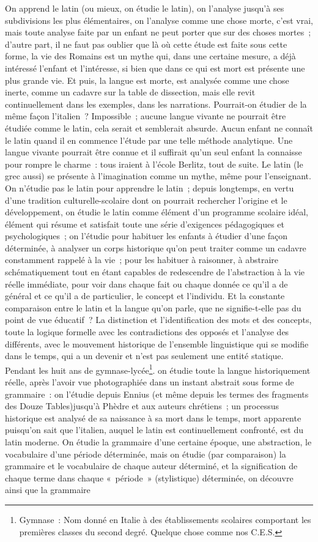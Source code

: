 \documentclass[french,twoside]{book} %
\begin{document}
On apprend le latin (ou mieux, on étudie le latin), on l’analyse jusqu’à ses subdivisions les plus élémentaires, on l’analyse comme une chose morte, c’est vrai, mais toute analyse faite par un enfant ne peut porter que sur des choses mortes ; d’autre part, il ne faut pas oublier que là où cette étude est faite sous cette forme, la vie des Romains est un mythe qui, dans une certaine mesure, a déjà intéressé l’enfant et l’intéresse, si bien que dans ce qui est mort est présente une plus grande vie. Et puis, la langue est morte, est analysée comme une chose inerte, comme un cadavre sur la table de dissection, mais elle revit continuellement dans les exemples, dans les narrations. Pourrait-on étudier de la même façon l’italien ? Impossible ; aucune langue vivante ne pourrait être étudiée comme le latin, cela serait et semblerait absurde. Aucun enfant ne connaît le latin quand il en commence l’étude par une telle méthode analytique. Une langue vivante pourrait être connue et il suffirait qu’un seul enfant la connaisse pour rompre le charme : tous iraient à l’école Berlitz, tout de suite. Le latin (le grec aussi) se présente à l’imagination comme un mythe, même pour l’enseignant. On n’étudie pas le latin pour apprendre le latin ; depuis longtemps, en vertu d’une tradition culturelle-scolaire dont on pourrait rechercher l’origine et le développement, on étudie le latin comme élément d’un programme scolaire idéal, élément qui résume et satisfait toute une série d’exigences pédagogiques et psychologiques ; on l’étudie pour habituer les enfants à étudier d’une façon déterminée, à analyser un corps historique qu’on peut traiter comme un cadavre constamment rappelé à la vie ; pour les habituer à raisonner, à abstraire schématiquement tout en étant capables de redescendre de l’abstraction à la vie réelle immédiate, pour voir dans chaque fait ou chaque donnée ce qu’il a de général et ce qu’il a de particulier, le concept et l’individu. Et la constante comparaison entre le latin et la langue qu’on parle, que ne signifie-t-elle pas du point de vue éducatif ? La distinction et l’identification des mots et des concepts, toute la logique formelle avec les contradictions des opposés et l’analyse des différents, avec le mouvement historique de l’ensemble linguistique qui se modifie dans le temps, qui a un devenir et n’est pas seulement une entité statique. Pendant les huit ans de gymnase-lycée\footnote{Gymnase : Nom donné en Italie à des établissements scolaires comportant les premières classes du second degré. Quelque chose comme nos C.E.S.}. on étudie toute la langue historiquement réelle, après l’avoir vue photographiée dans un instant abstrait sous forme de grammaire : on l’étudie depuis Ennius (et même depuis les termes des fragments des Douze Tables)jusqu’à Phèdre et aux auteurs chrétiens ; un processus historique est analysé de sa naissance à sa mort dans le temps, mort apparente puisqu’on sait que l’italien, auquel le latin est continuellement confronté, est du latin moderne. On étudie la grammaire d’une certaine époque, une abstraction, le vocabulaire d’une période déterminée, mais on étudie (par comparaison) la grammaire et le vocabulaire de chaque auteur déterminé, et la signification de chaque terme dans chaque « période » (stylistique) déterminée, on découvre ainsi que la grammaire 
\end{document}

